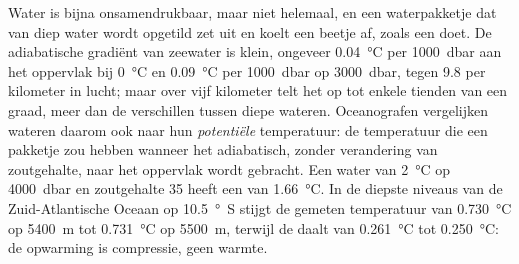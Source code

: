 Water is bijna onsamendrukbaar, maar niet helemaal, en een waterpakketje dat van diep water wordt opgetild zet uit en koelt een beetje af, zoals een  doet. De adiabatische gradiënt van zeewater is klein, ongeveer \qty{0.04}{\celsius} per \qty{1000}{dbar} aan het oppervlak bij \qty{0}{\celsius} en \qty{0.09}{\celsius} per \qty{1000}{dbar} op \qty{3000}{dbar}, tegen \num{9.8} per kilometer in lucht; maar over vijf kilometer telt het op tot enkele tienden van een graad, meer dan de verschillen tussen diepe wateren. Oceanografen vergelijken wateren daarom ook naar hun \emph{potentiële} temperatuur: de temperatuur die een pakketje zou hebben wanneer het adiabatisch, zonder verandering van zoutgehalte, naar het oppervlak wordt gebracht. Een water van \qty{2}{\celsius} op \qty{4000}{dbar} en zoutgehalte 35 heeft een  van \qty{1.66}{\celsius}. In de diepste niveaus van de Zuid-Atlantische Oceaan op \qty{10.5}{\degree S} stijgt de gemeten temperatuur van \qty{0.730}{\celsius} op \qty{5400}{m} tot \qty{0.731}{\celsius} op \qty{5500}{m}, terwijl de  daalt van \qty{0.261}{\celsius} tot \qty{0.250}{\celsius}: de opwarming is compressie, geen warmte.

